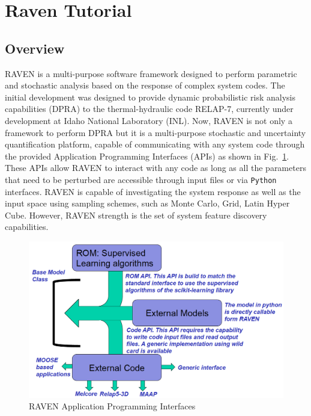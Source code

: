 \section{Raven Tutorial}
\label{sec:ravenTutorial}

\subsection{Overview}
\label{sub:overview}
RAVEN is a multi-purpose software framework designed to perform parametric and stochastic analysis based on the
response of complex system codes. The initial development was designed to provide dynamic probabilistic risk
analysis capabilities (DPRA) to the thermal-hydraulic code RELAP-7, currently under development at Idaho National
Laboratory (INL).
Now, RAVEN is not only a framework to perform DPRA but it is a multi-purpose stochastic and uncertainty 
quantification platform, capable of communicating with any system code through the provided  Application
Programming Interfaces (APIs) as shown in Fig.~\ref{fig:modelAPIs}. These APIs allow RAVEN to interact with any code as long as all the parameters
that need to be perturbed are accessible through input files or via  \texttt{Python} interfaces. RAVEN is capable
of investigating the system response as well as the input space using sampling schemes, such as Monte Carlo, Grid,
Latin Hyper Cube. However, RAVEN strength is the set of system feature discovery capabilities.
\begin{figure}[h!]
  \includegraphics[width=\textwidth]{pics/modelAPIs.png}
  \caption{RAVEN Application Programming Interfaces}
  \label{fig:modelAPIs}
\end{figure}

